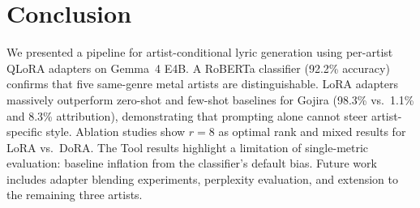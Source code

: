 \documentclass[runningheads]{llncs}
\begin{document}
\section{Conclusion}
\label{sec:conclusion}

We presented a pipeline for artist-conditional lyric generation using per-artist QLoRA adapters on Gemma~4 E4B. A RoBERTa classifier (92.2\% accuracy) confirms that five same-genre metal artists are distinguishable. LoRA adapters massively outperform zero-shot and few-shot baselines for Gojira (98.3\% vs.\ 1.1\% and 8.3\% attribution), demonstrating that prompting alone cannot steer artist-specific style. Ablation studies show $r{=}8$ as optimal rank and mixed results for LoRA vs.\ DoRA. The Tool results highlight a limitation of single-metric evaluation: baseline inflation from the classifier's default bias. Future work includes adapter blending experiments, perplexity evaluation, and extension to the remaining three artists.



\end{document}
